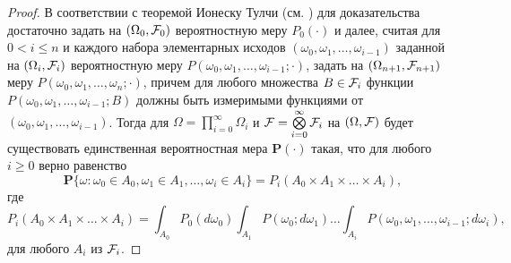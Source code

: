 \documentclass[a4paper,12pt,russian]{extarticle}
\renewcommand{\Pr}{{\mathbf P}}
\begin{document}
\begin{proof}
В соответствии с теоремой Ионеску Тулчи (см. \cite{Shiryaev}) для доказательства достаточно задать на $(\Omega_0, {\cal F}_0)$ вероятностную меру $P_0(\cdot)$ и далее, считая для $0 < i \leqslant n$ и каждого набора элементарных исходов $(\omega_0, \omega_1, \ldots, \omega_{i-1})$ заданной на $(\Omega_i, {\cal F}_i)$ вероятностную меру $P(\omega_0,\omega_1,\ldots, \omega_{i-1};\cdot)$, задать на $(\Omega_{n+1}, {\cal F}_{n+1})$ меру $P(\omega_0,\omega_1,\ldots, \omega_{n};\cdot)$, причем для любого множества $B\in {\cal F}_i$ функции $P(\omega_0,\omega_1,\ldots, \omega_{i-1};B)$
должны быть измеримыми функциями от $(\omega_0, \omega_1, \ldots, \omega_{i-1})$. Тогда для $\Omega=\prod\limits_{i=0}^{\infty}\Omega_i$ и ${\cal F}=\bigotimes\limits_{i=0}^{\infty} {\cal F}_i$ на $(\Omega,{\cal F})$ будет существовать единственная вероятностная мера $\Pr(\cdot)$ такая, что для любого $i \geqslant 0$ верно равенство
\begin{equation}
\Pr\{\omega \colon \omega_0 \in A_0, \omega_1 \in A_1, \ldots, \omega_i\in A_i\} = P_i(A_0 \times A_1 \times \ldots \times A_i),
\label{ProbabilitiesGeneral}
\end{equation}
где 
\begin{equation}
 P_i(A_0 \times A_1 \times \ldots \times A_i) = \int_{A_0} P_0(d \omega_0) \int_{A_1} P(\omega_0;d \omega_1) \ldots \int_{A_i} P(\omega_0, \omega_1, \ldots, \omega_{i-1}; d \omega_i),
\label{ProbabilitiesGeneralOne}
\end{equation}
для любого $A_i$ из ${\cal F}_i$. 


\end{proof}
\end{document}
